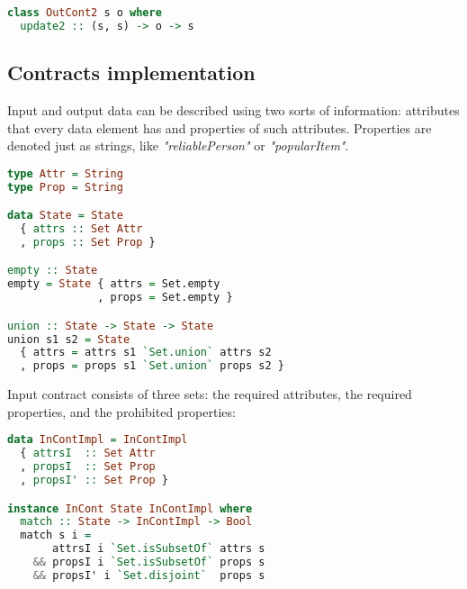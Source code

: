 \begin{lstlisting}[language=Haskell]
class OutCont2 s o where
  update2 :: (s, s) -> o -> s
\end{lstlisting}

\subsection{Contracts implementation}

Input and output data can be described using two sorts of information: attributes that every data element has and properties of such attributes.
Properties are denoted just as strings, like {\em "reliablePerson"} or {\em "popularItem"}.

\begin{lstlisting}[language=Haskell]
type Attr = String
type Prop = String

data State = State
  { attrs :: Set Attr
  , props :: Set Prop }

empty :: State
empty = State { attrs = Set.empty
              , props = Set.empty }

union :: State -> State -> State
union s1 s2 = State
  { attrs = attrs s1 `Set.union` attrs s2
  , props = props s1 `Set.union` props s2 }
\end{lstlisting}


Input contract consists of three sets: the required attributes, the required properties, and the prohibited properties:

\begin{lstlisting}[language=Haskell]
data InContImpl = InContImpl
  { attrsI  :: Set Attr
  , propsI  :: Set Prop
  , propsI' :: Set Prop }

instance InCont State InContImpl where
  match :: State -> InContImpl -> Bool
  match s i =
       attrsI i `Set.isSubsetOf` attrs s
    && propsI i `Set.isSubsetOf` props s
    && propsI' i `Set.disjoint`  props s
\end{lstlisting}

